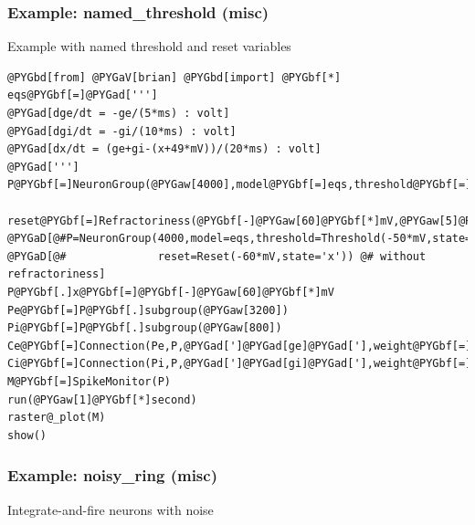 \documentclass[letterpaper,10pt,english]{manual}
\begin{document}
\resetcurrentobjects
\hypertarget{--doc-examples-misc_named_threshold}{}

\hypertarget{index-72}{}\subsubsection{Example: named\_threshold (misc)}

Example with named threshold and reset variables

\begin{Verbatim}[commandchars=@\[\]]
@PYGbd[from] @PYGaV[brian] @PYGbd[import] @PYGbf[*]
eqs@PYGbf[=]@PYGad[''']
@PYGad[dge/dt = -ge/(5*ms) : volt]
@PYGad[dgi/dt = -gi/(10*ms) : volt]
@PYGad[dx/dt = (ge+gi-(x+49*mV))/(20*ms) : volt]
@PYGad[''']
P@PYGbf[=]NeuronGroup(@PYGaw[4000],model@PYGbf[=]eqs,threshold@PYGbf[=]@PYGad[']@PYGad[x@textgreater[]-50*mV]@PYGad['],\
              reset@PYGbf[=]Refractoriness(@PYGbf[-]@PYGaw[60]@PYGbf[*]mV,@PYGaw[5]@PYGbf[*]ms,state@PYGbf[=]@PYGad[']@PYGad[x]@PYGad[']))
@PYGaD[@#P=NeuronGroup(4000,model=eqs,threshold=Threshold(-50*mV,state='x'),\]
@PYGaD[@#              reset=Reset(-60*mV,state='x')) @# without refractoriness]
P@PYGbf[.]x@PYGbf[=]@PYGbf[-]@PYGaw[60]@PYGbf[*]mV
Pe@PYGbf[=]P@PYGbf[.]subgroup(@PYGaw[3200])
Pi@PYGbf[=]P@PYGbf[.]subgroup(@PYGaw[800])
Ce@PYGbf[=]Connection(Pe,P,@PYGad[']@PYGad[ge]@PYGad['],weight@PYGbf[=]@PYGaw[1.62]@PYGbf[*]mV,sparseness@PYGbf[=]@PYGaw[0.02])
Ci@PYGbf[=]Connection(Pi,P,@PYGad[']@PYGad[gi]@PYGad['],weight@PYGbf[=]@PYGbf[-]@PYGaw[9]@PYGbf[*]mV,sparseness@PYGbf[=]@PYGaw[0.02])
M@PYGbf[=]SpikeMonitor(P)
run(@PYGaw[1]@PYGbf[*]second)
raster@_plot(M)
show()
\end{Verbatim}

\resetcurrentobjects
\hypertarget{--doc-examples-misc_noisy_ring}{}

\hypertarget{index-73}{}\subsubsection{Example: noisy\_ring (misc)}

Integrate-and-fire neurons with noise
\end{document}
